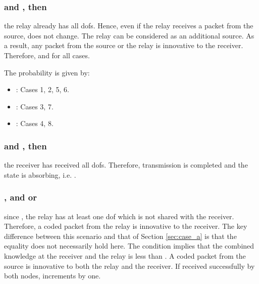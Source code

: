 \subsubsection{ and , then } the relay already has all dofs. Hence, even if the relay receives a packet from the source,  does not change. The relay can be considered as an additional source. As a result, any packet from the source or the relay is innovative to the receiver. Therefore,  and  for all cases.

The probability  is given by:
	    \begin{itemize}
            \item : Cases 1, 2, 5, 6.
            \item : Cases 3, 7.
            \item : Cases 4, 8.
	    \end{itemize}

\subsubsection{ and , then } the receiver has received all dofs. Therefore, transmission is completed and the state is absorbing, i.e. .

\subsubsection{, and  or } since , the relay has at least one dof which is not shared with the receiver. Therefore, a coded packet from the relay is innovative to the receiver. The key difference between this scenario and that of Section \ref{sec:case_a} is that the equality  does not necessarily hold here. The condition  implies that the combined knowledge at the receiver and the relay is less than . A coded packet from the source is innovative to both the relay and the receiver. If received successfully by both nodes,  increments by one.

